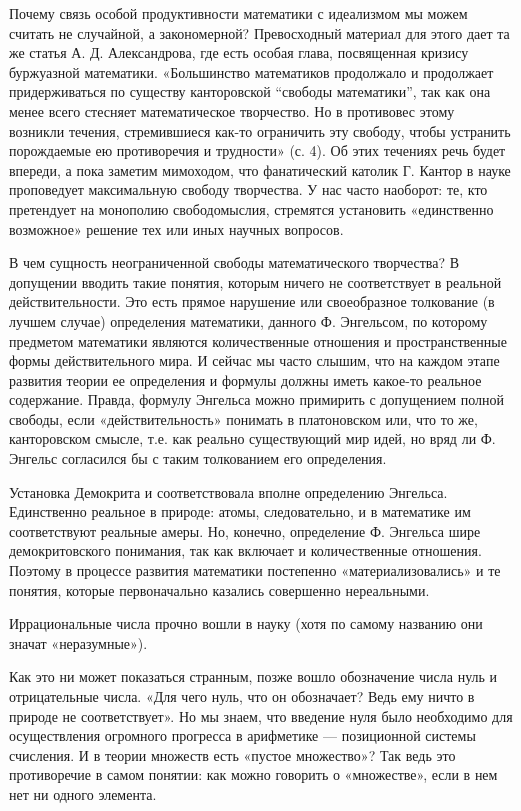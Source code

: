 Почему связь особой продуктивности математики с идеализмом мы
можем считать не случайной, а закономерной? Превосходный материал для
этого дает та же статья А. Д. Александрова, где есть особая глава,
посвященная кризису буржуазной математики. «Большинство математиков
продолжало и продолжает придерживаться по существу канторовской
``свободы математики'', так как она менее всего стесняет
математическое творчество. Но в противовес этому возникли течения,
стремившиеся как-то ограничить эту свободу, чтобы устранить
порождаемые ею противоречия и трудности» (с. 4). Об этих течениях речь
будет впереди, а пока заметим мимоходом, что фанатический католик Г.
Кантор в науке проповедует максимальную свободу творчества. У нас
часто наоборот: те, кто претендует на монополию свободомыслия,
стремятся установить «единственно возможное» решение тех или иных
научных вопросов.

В чем сущность неограниченной свободы математического творчества? В
допущении вводить такие понятия, которым ничего не соответствует в
реальной действительности. Это есть прямое нарушение или своеобразное
толкование (в лучшем случае) определения математики, данного Ф.
Энгельсом, по которому предметом математики являются количественные
отношения и пространственные формы действительного мира. И сейчас мы
часто слышим, что на каждом этапе развития теории ее определения и
формулы должны иметь какое-то реальное содержание. Правда, формулу
Энгельса можно примирить с допущением полной свободы, если
«действительность» понимать в платоновском или, что то же,
канторовском смысле, т.е. как реально существующий мир идей, но вряд
ли Ф. Энгельс согласился бы с таким толкованием его определения.

Установка Демокрита и соответствовала вполне определению Энгельса.
Единственно реальное в природе: атомы, следовательно, и в математике
им соответствуют реальные амеры. Но, конечно, определение Ф. Энгельса
шире демокритовского понимания, так как включает и количественные
отношения. Поэтому в процессе развития математики постепенно
«материализовались» и те понятия, которые первоначально казались
совершенно нереальными.

Иррациональные числа прочно вошли в науку (хотя по самому названию они
значат «неразумные»).

Как это ни может показаться странным, позже вошло обозначение числа
нуль и отрицательные числа. «Для чего нуль, что он обозначает? Ведь
ему ничто в природе не соответствует». Но мы знаем, что введение нуля
было необходимо для осуществления огромного прогресса в арифметике ---
позиционной системы счисления. И в теории множеств есть «пустое
множество»? Так ведь это противоречие в самом понятии: как можно
говорить о «множестве», если в нем нет ни одного элемента.

